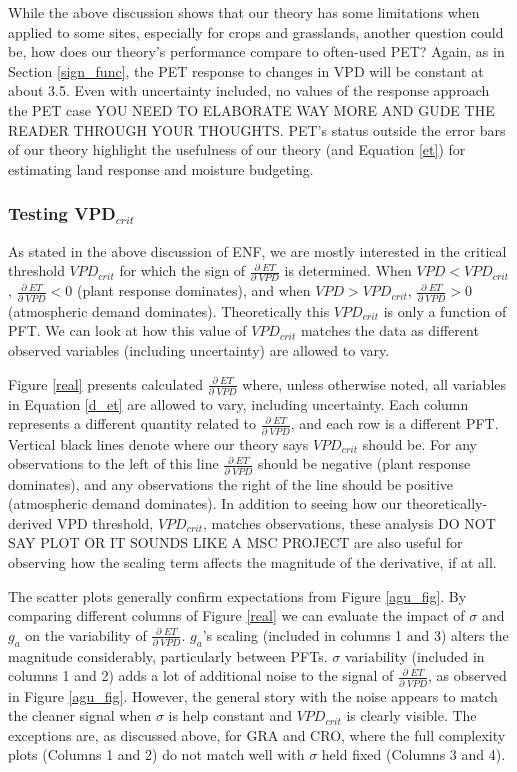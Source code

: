 \documentclass[draft,linenumbers]{agujournal}
\begin{document}
While the above discussion shows that our theory has some limitations when applied to some sites, especially for crops and grasslands, another question could be, how does our theory's performance compare to often-used PET? Again, as in Section \ref{sign_func}, the PET response to changes in VPD will be constant at about 3.5. Even with uncertainty included, no values of the response approach the PET case YOU NEED TO ELABORATE WAY MORE AND GUDE THE READER THROUGH YOUR THOUGHTS. PET's status outside the error bars of our theory highlight the usefulness of our theory (and Equation \ref{et}) for estimating land response and moisture budgeting.

\subsubsection{Testing VPD$_{crit}$}
As stated in the above discussion of ENF, we are mostly interested in the critical threshold $VPD_{crit}$ for which the sign of  $\frac{\partial \; ET}{\partial \; VPD}$ is determined. When $VPD < VPD_{crit}$, $\frac{\partial \; ET}{\partial \; VPD}  < 0$ (plant response dominates), and when $VPD > VPD_{crit}$, $\frac{\partial \; ET}{\partial \; VPD} > 0$ (atmospheric demand dominates). Theoretically this $VPD_{crit}$ is only a function of PFT. We can look at how this value of $VPD_{crit}$ matches the data as different observed variables (including uncertainty) are allowed to vary.


Figure \ref{real} presents calculated $\frac{\partial \; ET}{\partial \; VPD}$ where, unless otherwise noted, all variables in Equation \ref{d_et} are allowed to vary, including uncertainty. Each column represents a different quantity related to $\frac{\partial \; ET}{\partial \; VPD}$, and each row is a different PFT. Vertical black lines denote where our theory says $VPD_{crit}$ should be. For any observations to the left of this line $\frac{\partial \; ET}{\partial \; VPD}$ should be negative (plant response dominates), and any observations the right of the line should be positive (atmospheric demand dominates). In addition to seeing how our theoretically-derived VPD threshold, $VPD_{crit}$, matches observations, these analysis DO NOT SAY PLOT OR IT SOUNDS LIKE A MSC PROJECT are also useful for observing how the scaling term affects the magnitude of the derivative, if at all. 

The scatter plots generally confirm expectations from Figure \ref{agu_fig}. By comparing different columns of Figure \ref{real} we can evaluate the impact of $\sigma$ and $g_a$ on the variability of $\frac{\partial \; ET}{\partial \; VPD}$. $g_a$'s scaling (included in columns 1 and 3) alters the magnitude considerably, particularly between PFTs. $\sigma$ variability (included in columns 1 and 2) adds a lot of additional noise to the signal of $\frac{\partial \; ET}{\partial \; VPD}$, as observed in Figure \ref{agu_fig}. However, the general story with the noise appears to match the cleaner signal when $\sigma$ is help constant and $VPD_{crit}$ is clearly visible. The exceptions are, as discussed above, for GRA and CRO, where the full complexity plots (Columns 1 and 2) do not match well with $\sigma$ held fixed (Columns 3 and 4).
\end{document}
